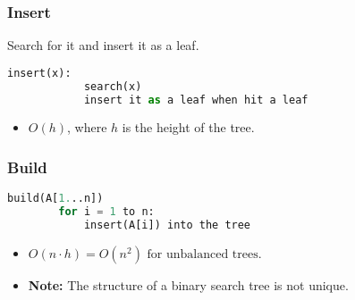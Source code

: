 \subsubsection{Insert}

\begin{definition}
    Search for it and insert it as a leaf. 

    \begin{lstlisting}[language=Python, caption={Insert Operation}]
        insert(x):
            search(x)
            insert it as a leaf when hit a leaf
    \end{lstlisting}

    \begin{itemize}
        \item \( O(h) \), where \( h \) is the height of the tree.
    \end{itemize}
\end{definition}

\subsubsection{Build}
\begin{definition}
    \begin{lstlisting}[language=Python, caption={Build Operation}]
    build(A[1...n])
        for i = 1 to n:
            insert(A[i]) into the tree
    \end{lstlisting}

    \begin{itemize}
        \item $O(n \cdot h) = O(n^2) \text{ for unbalanced trees}.$
        \item \textbf{Note:} The structure of a binary search tree is not unique.
    \end{itemize}
\end{definition}

\begin{example}
\end{example}

